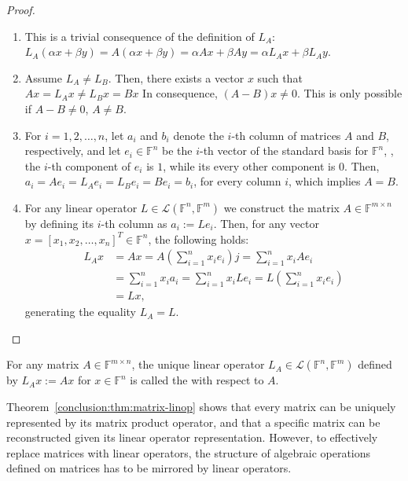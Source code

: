 \begin{proof}~\\
\begin{enumerate}
\item This is a trivial consequence of the definition of $L_A$: $L_A(\alpha x +
\beta y) = A(\alpha x + \beta y) = \alpha Ax + \beta Ay = \alpha L_Ax + \beta
L_Ay$.
\item Assume $L_A \neq L_B$. Then, there exists a vector $x$ such that $Ax =
L_Ax \neq L_B x = Bx$ In consequence, $(A - B)x \neq 0$. This is only
possible if $A - B \neq 0$, \ie $A \neq B$.
\item For $i = 1,2, \ldots, n$, let $a_i$ and $b_i$ denote the $i$-th column of
matrices $A$ and $B$, respectively, and let $e_i \in \mathbb{F}^n$ be the $i$-th
vector of the standard basis for $\mathbb{F}^n$, \ie, the $i$-th component of
$e_i$ is $1$, while its every other component is $0$. Then, $a_i = Ae_i = L_Ae_i
= L_B e_i = Be_i = b_i$, for every column $i$, which implies $A = B$.
\item For any linear operator $L \in \mathcal{L}(\mathbb{F}^n, \mathbb{F}^m)$ we
construct the matrix $A \in \mathbb{F}^{m \times n}$ by defining its $i$-th
column as $a_i := Le_i$. Then, for any vector $x = [ x_1, x_2, \ldots, x_n ]^T 
\in \mathbb{F}^n$, the following holds:
\begin{align}
L_Ax &= Ax = A(\sum_{i=1}^n x_i e_i) j = \sum_{i=1}^n x_i Ae_i \nonumber \\
     &= \sum_{i=1}^n x_i a_i = \sum_{i=1}^n x_i Le_i
      = L(\sum_{i=1}^n x_i e_i) \label{conclusion:eqn:surjection} \\
     &= Lx, \nonumber
\end{align}
generating the equality $L_A = L$.
\end{enumerate}
\end{proof}

\begin{definition}
For any matrix $A \in \mathbb{F}^{m \times n}$, the unique linear operator $L_A
\in \mathcal{L}(\mathbb{F}^n, \mathbb{F}^m)$ defined by $L_Ax := Ax$ for $x \in
\mathbb{F}^n$ is called the  with respect
to $A$.
\end{definition}

Theorem~\ref{conclusion:thm:matrix-linop} shows that every matrix can be
uniquely represented by its matrix product operator, and that a specific matrix
can be reconstructed given its linear operator representation. However, to
effectively replace matrices with linear operators, the structure of algebraic
operations defined on matrices has to be mirrored by linear operators.

